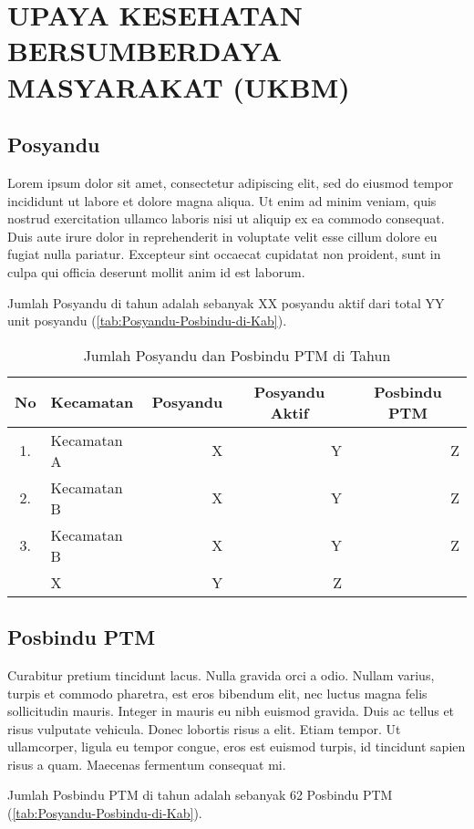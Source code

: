 \section[UKBM]{UPAYA KESEHATAN BERSUMBERDAYA MASYARAKAT (UKBM)}%
\subsection{Posyandu}
Lorem ipsum dolor sit amet, consectetur adipiscing elit, sed do eiusmod tempor incididunt ut labore et dolore magna aliqua. Ut enim ad minim veniam, quis nostrud exercitation ullamco laboris nisi ut aliquip ex ea commodo consequat. Duis aute irure dolor in reprehenderit in voluptate velit esse cillum dolore eu fugiat nulla pariatur. Excepteur sint occaecat cupidatat non proident, sunt in culpa qui officia deserunt mollit anim id est laborum.

Jumlah Posyandu di \namaKabupaten tahun \tP adalah sebanyak XX posyandu aktif dari total YY unit posyandu (\autoref{tab:Posyandu-Posbindu-di-Kab}).

\begin{table}[!h]
\caption{Jumlah Posyandu dan Posbindu PTM di \namaKabupaten Tahun \tP }
\label{tab:Posyandu-Posbindu-di-Kab}
\centering{}%

\begin{tabular}{clrrr}
\toprule
No & Kecamatan & \multicolumn{1}{c}{Posyandu} & \multicolumn{1}{c}{Posyandu Aktif} & \multicolumn{1}{c}{Posbindu PTM}\\
\midrule
1. & Kecamatan A & X & Y & Z\\
\rowcolor{black!20}2. & Kecamatan B & X & Y & Z\\
3. & Kecamatan B & X & Y & Z\\
\midrule
\rowcolor{blue!20}\multicolumn{2}{c}{Jumlah} & X & Y & Z\\
\bottomrule
\end{tabular}
\end{table}

\subsection{Posbindu PTM}
Curabitur pretium tincidunt lacus. Nulla gravida orci a odio. Nullam varius, turpis et commodo pharetra, est eros bibendum elit, nec luctus magna felis sollicitudin mauris. Integer in mauris eu nibh euismod gravida. Duis ac tellus et risus vulputate vehicula. Donec lobortis risus a elit. Etiam tempor. Ut ullamcorper, ligula eu tempor congue, eros est euismod turpis, id tincidunt sapien risus a quam. Maecenas fermentum consequat mi. 

Jumlah Posbindu PTM di \namaKabupaten tahun \tP adalah sebanyak 62 Posbindu PTM (\autoref{tab:Posyandu-Posbindu-di-Kab}).
